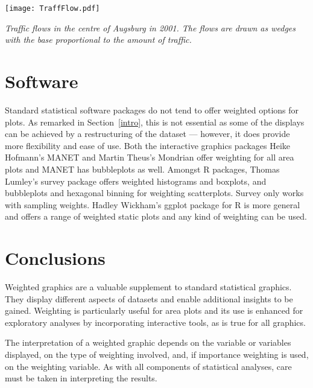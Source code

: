 \documentclass{svmult}
\begin{document}
\begin{center}
      \texttt{[image: TraffFlow.pdf]}
      \caption{\label{traffic}\em Traffic flows in the centre of Augsburg in 2001. The flows are drawn as wedges with the base proportional to the amount of traffic. }
      \end{center}

\section{Software}
\label{sw}
Standard statistical software packages do not tend to offer weighted options for plots.  As remarked in Section~\ref{intro}, this is not essential as some of the displays can be achieved by a restructuring of the dataset --- however, it does provide more flexibility and ease of use.  Both the interactive graphics packages Heike Hofmann's MANET \citep{hofmann:2000a} and Martin Theus's Mondrian \citep{theus:2005} offer weighting for all area plots and MANET has bubbleplots as well.  Amongst R packages, Thomas Lumley's survey package offers weighted histograms and boxplots, and bubbleplots and hexagonal binning for weighting scatterplots.  Survey only works with sampling weights.  Hadley Wickham's ggplot package for R is more general and offers a range of weighted static plots and any kind of weighting can be used.

\section{Conclusions}
\label{conc}
Weighted graphics are a valuable supplement to standard statistical graphics.  They display different aspects of datasets and enable additional insights to be gained.  Weighting is particularly useful for area plots and its use is enhanced for exploratory analyses by incorporating interactive tools, as is true for all graphics.

The interpretation of a weighted graphic depends on the variable or variables displayed, on the type of weighting involved, and, if importance weighting is used, on the weighting variable.  As with all components of statistical analyses, care must be taken in interpreting the results.



\end{document}
